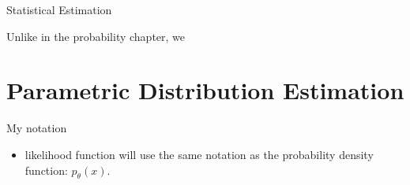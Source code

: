 \begin{chapter}{Statistical Estimation}










    Unlike in the probability chapter, we

    \section{Parametric Distribution Estimation}

    My notation
    \begin{itemize}
        \item likelihood function will use the same notation as the probability density function: $p_{\theta}(x)$.
    \end{itemize}


\end{chapter}
